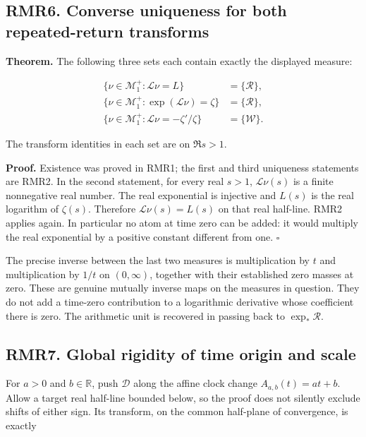 \documentclass[
]{article}
\begin{document}
\subsection{RMR6. Converse uniqueness for both repeated-return
transforms}\label{rmr6.-converse-uniqueness-for-both-repeated-return-transforms}

\textbf{Theorem.} The following three sets each contain exactly the
displayed measure:

\[
\begin{aligned}
\{\nu\in\mathscr M_1^+:\mathcal L\nu=L\}&=\{\mathcal R\},\\
\{\nu\in\mathscr M_1^+:\exp(\mathcal L\nu)=\zeta\}&=\{\mathcal R\},\\
\{\nu\in\mathscr M_1^+:\mathcal L\nu=-\zeta'/\zeta\}&=\{\mathcal W\}.
\end{aligned}
\tag{RMR6.1}
\]

The transform identities in each set are on \(\Re s>1\).

\textbf{Proof.} Existence was proved in RMR1; the first and third
uniqueness statements are RMR2. In the second statement, for every real
\(s>1\), \(\mathcal L\nu(s)\) is a finite nonnegative real number. The
real exponential is injective and \(L(s)\) is the real logarithm of
\(\zeta(s)\). Therefore \(\mathcal L\nu(s)=L(s)\) on that real
half-line. RMR2 applies again. In particular no atom at time zero can be
added: it would multiply the real exponential by a positive constant
different from one. \(\square\)

The precise inverse between the last two measures is multiplication by
\(t\) and multiplication by \(1/t\) on \((0,\infty)\), together with
their established zero masses at zero. These are genuine mutually
inverse maps on the measures in question. They do not add a time-zero
contribution to a logarithmic derivative whose coefficient there is
zero. The arithmetic unit is recovered in passing back to
\(\exp_*\mathcal R\).

\subsection{RMR7. Global rigidity of time origin and
scale}\label{rmr7.-global-rigidity-of-time-origin-and-scale}

For \(a>0\) and \(b\in\mathbb R\), push \(\mathcal D\) along the affine
clock change \(A_{a,b}(t)=at+b\). Allow a target real half-line bounded
below, so the proof does not silently exclude shifts of either sign. Its
transform, on the common half-plane of convergence, is exactly
\end{document}
